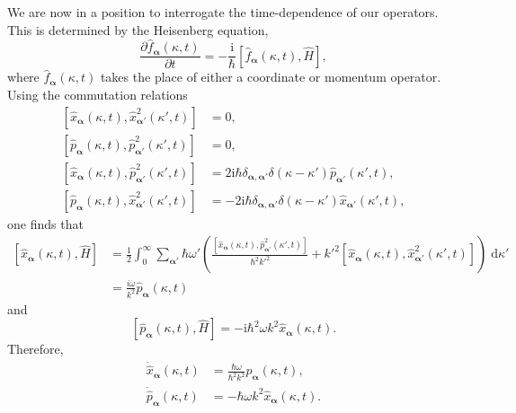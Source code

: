\documentclass{article}
\numberwithin{equation}{section}
\begin{document}
We are now in a position to interrogate the time-dependence of our operators. This is determined by the Heisenberg equation,
\begin{equation}
\frac{\partial \hat{f}_{\bm{\alpha}}(\kappa,t)}{\partial t} = -\frac{\mathrm{i}}{\hbar}\left[\hat{f}_{\bm{\alpha}}(\kappa,t),\hat{H}\right],
\end{equation}
where $\hat{f}_{\bm{\alpha}}(\kappa,t)$ takes the place of either a coordinate or momentum operator. Using the commutation relations
\begin{equation}
\begin{split}
\left[\hat{x}_{\bm{\alpha}}(\kappa,t),\hat{x}^2_{\bm{\alpha}'}(\kappa',t)\right] &= 0,\\
\left[\hat{p}_{\bm{\alpha}}(\kappa,t),\hat{p}^2_{\bm{\alpha}'}(\kappa',t)\right] &= 0,\\
\left[\hat{x}_{\bm{\alpha}}(\kappa,t),\hat{p}^2_{\bm{\alpha}'}(\kappa',t)\right] &= 2\mathrm{i}\hbar\delta_{\bm{\alpha},\bm{\alpha}'}\delta(\kappa - \kappa')\hat{p}_{\bm{\alpha}'}(\kappa',t),\\
\left[\hat{p}_{\bm{\alpha}}(\kappa,t),\hat{x}^2_{\bm{\alpha}'}(\kappa',t)\right] &= -2\mathrm{i}\hbar\delta_{\bm{\alpha},\bm{\alpha}'}\delta(\kappa - \kappa')\hat{x}_{\bm{\alpha}'}(\kappa',t),
\end{split}
\end{equation}
one finds that 
\begin{equation}
\begin{split}
\left[\hat{x}_{\bm{\alpha}}(\kappa,t),\hat{H}\right] &= \frac{1}{2}\int_0^\infty\sum_{\bm{\alpha}'}\hbar\omega'\left(\frac{\left[\hat{x}_{\bm{\alpha}}(\kappa,t),\hat{p}_{\bm{\alpha}'}^2(\kappa',t)\right]}{\hbar^2k'^2} + k'^2\left[\hat{x}_{\bm{\alpha}}(\kappa,t),\hat{x}_{\bm{\alpha}'}^2(\kappa',t)\right]\right)\;\mathrm{d}\kappa'\\
&= \frac{i\omega}{k^2}\hat{p}_{\bm{\alpha}}(\kappa,t)
\end{split}
\end{equation}
and
\begin{equation}
\left[\hat{p}_{\bm{\alpha}}(\kappa,t),\hat{H}\right] = -\mathrm{i}\hbar^2\omega k^2\hat{x}_{\bm{\alpha}}(\kappa,t).
\end{equation}
Therefore,
\begin{equation}
\begin{split}
\dot{\hat{x}}_{\bm{\alpha}}(\kappa,t) &= \frac{\hbar\omega}{\hbar^2k^2}\hat{p}_{\bm{\alpha}}(\kappa,t),\\
\dot{\hat{p}}_{\bm{\alpha}}(\kappa,t) &= -\hbar\omega k^2\hat{x}_{\bm{\alpha}}(\kappa,t).
\end{split}
\end{equation}
\end{document}
